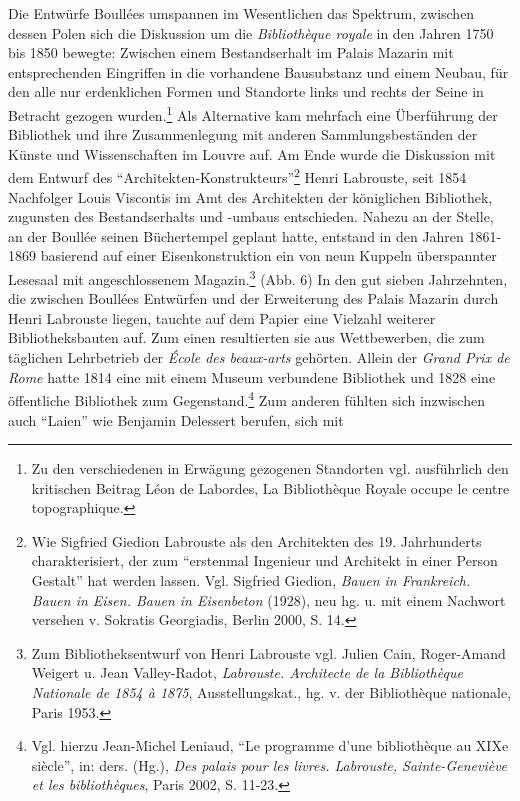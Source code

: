 Die Entwürfe Boullées umspannen im Wesentlichen das Spektrum, zwischen
dessen Polen sich die Diskussion um die \emph{Bibliothèque royale} in
den Jahren 1750 bis 1850 bewegte: Zwischen einem Bestandserhalt im
Palais Mazarin mit entsprechenden Eingriffen in die vorhandene
Bausubstanz und einem Neubau, für den alle nur erdenklichen Formen und
Standorte links und rechts der Seine in Betracht gezogen
wurden.\footnote{Zu den verschiedenen in Erwägung gezogenen Standorten
  vgl. ausführlich den kritischen Beitrag Léon de Labordes, La
  Bibliothèque Royale occupe le centre topographique.} Als Alternative
kam mehrfach eine Überführung der Bibliothek und ihre Zusammenlegung mit
anderen Sammlungsbeständen der Künste und Wissenschaften im Louvre auf.
Am Ende wurde die Diskussion mit dem Entwurf des
\enquote{Architekten-Konstrukteurs}\footnote{Wie Sigfried Giedion
  Labrouste als den Architekten des 19. Jahrhunderts charakterisiert,
  der zum \enquote{erstenmal Ingenieur und Architekt in einer Person
  Gestalt} hat werden lassen. Vgl. Sigfried Giedion, \emph{Bauen in
  Frankreich. Bauen in Eisen. Bauen in Eisenbeton} (1928), neu hg. u.
  mit einem Nachwort versehen v. Sokratis Georgiadis, Berlin 2000, S.
  14.} Henri Labrouste, seit 1854 Nachfolger Louis Viscontis im Amt des
Architekten der königlichen Bibliothek, zugunsten des Bestandserhalts
und -umbaus entschieden. Nahezu an der Stelle, an der Boullée seinen
Büchertempel geplant hatte, entstand in den Jahren 1861-1869 basierend
auf einer Eisenkonstruktion ein von neun Kuppeln überspannter Lesesaal
mit angeschlossenem Magazin.\footnote{Zum Bibliotheksentwurf von Henri
  Labrouste vgl. Julien Cain, Roger-Amand Weigert u. Jean Valley-Radot,
  \emph{Labrouste. Architecte de la Bibliothèque Nationale de 1854 à
  1875}, Ausstellungskat., hg. v. der Bibliothèque nationale, Paris
  1953.} (Abb. 6) In den gut sieben Jahrzehnten, die zwischen Boullées
Entwürfen und der Erweiterung des Palais Mazarin durch Henri Labrouste
liegen, tauchte auf dem Papier eine Vielzahl weiterer Bibliotheksbauten
auf. Zum einen resultierten sie aus Wettbewerben, die zum täglichen
Lehrbetrieb der \emph{École des beaux-arts} gehörten. Allein der
\emph{Grand Prix de Rome} hatte 1814 eine mit einem Museum verbundene
Bibliothek und 1828 eine öffentliche Bibliothek zum
Gegenstand.\footnote{Vgl. hierzu Jean-Michel Leniaud, \enquote{Le
  programme d'une bibliothèque au XIXe siècle}, in: ders. (Hg.),
  \emph{Des palais pour les livres. Labrouste, Sainte-Geneviève et les
  bibliothèques}, Paris 2002, S. 11-23.} Zum anderen fühlten sich
inzwischen auch \enquote{Laien} wie Benjamin Delessert berufen, sich mit
